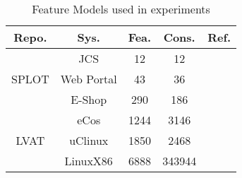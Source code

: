 \begin{table}[bp]
 
  \centering
  \scriptsize
    \caption{Feature Models used in experiments}
    \begin{tabular}{|c|c|c|c|c|}
    \hline
    \textbf{Repo.} & \textbf{Sys.} & \textbf{Fea.} & \textbf{Cons.} & \multicolumn{1}{c|}{\textbf{Ref.}} \bigstrut\\
    \hline
    \multirow{3}[6]{*}{SPLOT} & JCS   & 12    & 12    &  \cite{DBLP:conf/issta/TanXCSLD15} \bigstrut   \\
\cline{2-5}          & Web Portal & 43    & 36    &  \cite{DBLP:conf/sac/MendoncaBC08} \bigstrut\\
\cline{2-5}          & E-Shop & 290   & 186   &  \cite{DBLP:conf/wcre/XueXJ10} \bigstrut\\
    \hline
    \multirow{3}[6]{*}{LVAT} & eCos  & 1244  & 3146  &  \cite{DBLP:conf/icse/SheLBWC11,DBLP:conf/wcre/XueXJ10} \bigstrut\\
\cline{2-5}          & uClinux & 1850  & 2468  &  \cite{Berger12variabilitymodeling} \bigstrut\\
\cline{2-5}          & LinuxX86 & 6888  & 343944 & \cite{DBLP:conf/icse/SheLBWC11}  \bigstrut\\
    \hline
    \end{tabular}%
 
  \label{table:feaModel}%
\end{table}%
